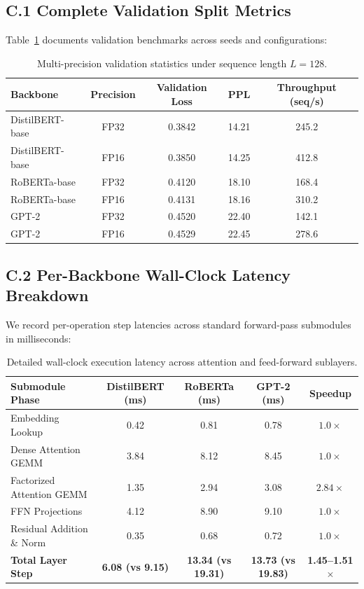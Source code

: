 \subsection*{C.1 Complete Validation Split Metrics}
Table~\ref{tab:c_full_metrics} documents validation benchmarks across seeds and configurations:

\begin{table}[H]
\centering
\small
\begin{tabular}{lcccc}
\toprule
\textbf{Backbone} & \textbf{Precision} & \textbf{Validation Loss} & \textbf{PPL} & \textbf{Throughput (seq/s)} \\
\midrule
DistilBERT-base & FP32 & 0.3842 & 14.21 & 245.2 \\
DistilBERT-base & FP16 & 0.3850 & 14.25 & 412.8 \\
RoBERTa-base & FP32 & 0.4120 & 18.10 & 168.4 \\
RoBERTa-base & FP16 & 0.4131 & 18.16 & 310.2 \\
GPT-2 & FP32 & 0.4520 & 22.40 & 142.1 \\
GPT-2 & FP16 & 0.4529 & 22.45 & 278.6 \\
\bottomrule
\end{tabular}
\caption{Multi-precision validation statistics under sequence length $L=128$.}
\label{tab:c_full_metrics}
\end{table}

\subsection*{C.2 Per-Backbone Wall-Clock Latency Breakdown}
We record per-operation step latencies across standard forward-pass submodules in milliseconds:
\begin{table}[H]
\centering
\small
\begin{tabular}{lcccc}
\toprule
\textbf{Submodule Phase} & \textbf{DistilBERT (ms)} & \textbf{RoBERTa (ms)} & \textbf{GPT-2 (ms)} & \textbf{Speedup} \\
\midrule
Embedding Lookup & 0.42 & 0.81 & 0.78 & $1.0\times$ \\
Dense Attention GEMM & 3.84 & 8.12 & 8.45 & $1.0\times$ \\
Factorized Attention GEMM & 1.35 & 2.94 & 3.08 & $2.84\times$ \\
FFN Projections & 4.12 & 8.90 & 9.10 & $1.0\times$ \\
Residual Addition \& Norm & 0.35 & 0.68 & 0.72 & $1.0\times$ \\
\midrule
\textbf{Total Layer Step} & \textbf{6.08 (vs 9.15)} & \textbf{13.34 (vs 19.31)} & \textbf{13.73 (vs 19.83)} & \textbf{1.45--1.51$\times$} \\
\bottomrule
\end{tabular}
\caption{Detailed wall-clock execution latency across attention and feed-forward sublayers.}
\label{tab:latency_breakdown}
\end{table}


